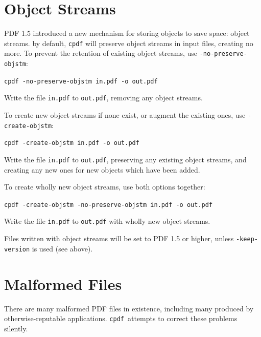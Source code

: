 \documentclass{book}
\newcommand{\cpdf}{\texttt{cpdf}}
\begin{document}
\section{Object Streams}
PDF 1.5 introduced a new mechanism for storing objects to save space: object streams. by default, \texttt{cpdf} will preserve object streams in input files, creating no more. To prevent the retention of existing object streams, use \texttt{-no-preserve-objstm}:

\begin{framed}
\noindent\small\verb!cpdf -no-preserve-objstm in.pdf -o out.pdf!

\vspace{2.5mm}
\noindent Write the file \texttt{in.pdf} to \texttt{out.pdf}, removing any object streams.
\end{framed}

\noindent To create new object streams if none exist, or augment the existing ones, use \texttt{-create-objstm}:

\begin{framed}
\noindent\small\verb!cpdf -create-objstm in.pdf -o out.pdf!

\vspace{2.5mm}
\noindent Write the file \texttt{in.pdf} to \texttt{out.pdf}, preserving any existing object streams, and creating any new ones for new objects which have been added.
\end{framed}

\noindent To create wholly new object streams, use both options together:

\begin{framed}
\noindent\small\verb!cpdf -create-objstm -no-preserve-objstm in.pdf -o out.pdf!

\vspace{2.5mm}
\noindent Write the file \texttt{in.pdf} to \texttt{out.pdf} with wholly new object streams.
\end{framed}

\noindent Files written with object streams will be set to PDF 1.5 or higher, unless \texttt{-keep-version} is used (see above).

\section{Malformed Files}
\label{fast}
There are many malformed PDF files in existence, including many produced by
otherwise-reputable applications. \cpdf\ attempts to correct these problems
silently.
\end{document}
